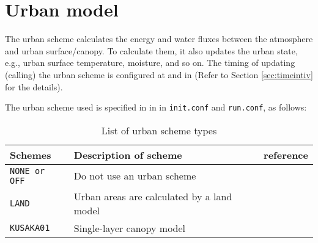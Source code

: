 \section{Urban model} \label{sec:basic_usel_urban}
The urban scheme calculates the energy and water fluxes between the atmosphere and urban surface/canopy.
To calculate them, it also updates the urban state, e.g., urban surface temperature, moisture, and so on. 
The timing of updating (calling) the urban scheme is configured
at  and  in 
(Refer to Section \ref{sec:timeintiv} for the details).


The urban scheme used is specified in  in  in \verb|init.conf| and \verb|run.conf|, as follows:
%

\begin{table}[hbt]
\begin{center}
  \caption{List of urban scheme types}
  \label{tab:nml_urban}
  \begin{tabularx}{150mm}{llX} \hline
    \rowcolor[gray]{0.9}  Schemes  & Description of scheme & reference \\ \hline
      \verb|NONE or OFF|          & Do not use an urban scheme     &                  \\
      \verb|LAND|                 & Urban areas are calculated by a land model   &   \\
      \verb|KUSAKA01|             & Single-layer canopy model  & \citet{kusaka_2001} \\
    \hline
  \end{tabularx}
\end{center}
\end{table}


